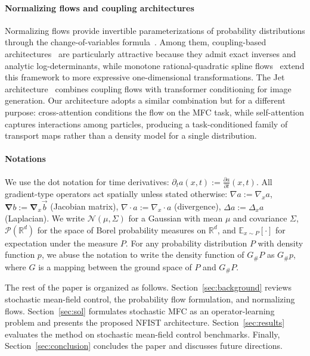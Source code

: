 \documentclass[preprint]{elsarticle}
\newcommand{\R}{\mathbb{R}}
\newcommand{\E}{\mathbb{E}}
\newcommand{\pr}{\mathscr{P}}
\newcommand{\m}{\mu}
\newcommand{\Sig}{\Sigma}               \renewcommand{\th}{\theta}
\newcommand{\sN}{\mathcal{N}}
\begin{document}
\paragraph{Normalizing flows and coupling architectures}
Normalizing flows provide invertible parameterizations of probability distributions through the change-of-variables formula~\cite{rezende2015flow,papamakarios2021nf,Kobyzev2021}. Among them, coupling-based architectures~\cite{dinh2014nice,dinh2017realnvp} are particularly attractive because they admit exact inverses and analytic log-determinants, while monotone rational-quadratic spline flows~\cite{durkan2019nsf} extend this framework to more expressive one-dimensional transformations. The Jet architecture~\cite{kolesnikov2024jet} combines coupling flows with transformer conditioning for image generation. Our architecture adopts a similar combination but for a different purpose: cross-attention conditions the flow on the MFC task, while self-attention captures interactions among particles, producing a task-conditioned family of transport maps rather than a density model for a single distribution.


\paragraph{Notations}\label{sec:notation}

We use the dot notation for time derivatives: $\partial_t a(x,t) := \frac{\partial a}{\partial t}(x,t)$. All gradient-type operators act spatially unless stated otherwise: $\nabla a := \nabla_x a$, $\boldsymbol{\nabla} b := \boldsymbol{\nabla}_x\vec b$ (Jacobian matrix), $\nabla\cdot a := \nabla_x\cdot a$ (divergence), $\Delta a := \Delta_x a$ (Laplacian). We write $\sN(\m,\Sig)$ for a Gaussian with mean $\m$ and covariance $\Sig$, $\pr(\R^d)$ for the space of Borel probability measures on $\R^d$, and $\E_{x\sim P}[\cdot]$ for expectation under the measure $P$. For any probability distribution $P$ with density function $p$, we abuse the notation to write the density function of $G_\# P$ as $G_\# p$, where $G$ is a mapping between the ground space of $P$ and $G_\# P$.

The rest of the paper is organized as follows. Section~\ref{sec:background} reviews stochastic mean-field control, the probability flow formulation, and normalizing flows. Section~\ref{sec:sol} formulates stochastic MFC as an operator-learning problem and presents the proposed NFIST architecture. Section~\ref{sec:results} evaluates the method on stochastic mean-field control benchmarks. Finally, Section~\ref{sec:conclusion} concludes the paper and discusses future directions.
\end{document}
